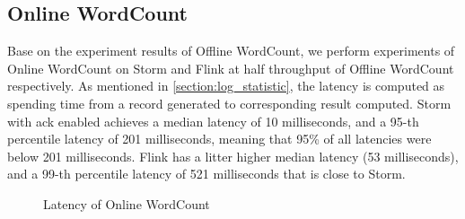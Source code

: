 \subsection{Online WordCount}
Base on the experiment results of Offline WordCount, we perform experiments of Online WordCount on Storm and Flink at half throughput of Offline WordCount respectively.  As mentioned in \cref{section:log_statistic}, the latency is computed as spending time from a record generated to corresponding result computed. Storm with ack enabled achieves a median latency of 10 milliseconds, and a 95-th percentile latency of 201 milliseconds, meaning that 95\% of all latencies were below 201 milliseconds. Flink has a litter higher median latency (53 milliseconds), and a 99-th percentile latency of 521 milliseconds that is close to Storm. 

\begin{figure}
  \begin{center}
   \caption{Latency of Online WordCount}
   \label{fig:online_wordcount_latency}
  \end{center}
\end{figure}

